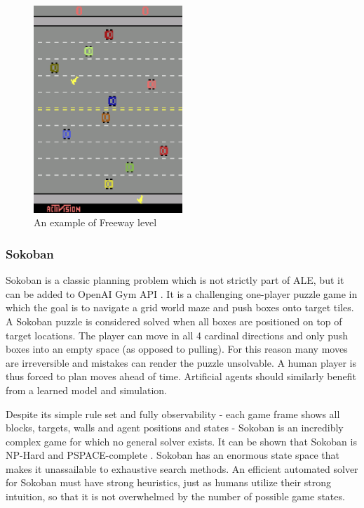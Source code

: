 \begin{figure}[H]
\includegraphics[width=0.5\textwidth,keepaspectratio]{figures/Freeway.png}
\caption[Freeway]{An example of Freeway level}
\label{Fig.Freeway}
\end{figure}

\subsubsection{Sokoban}

Sokoban is a classic planning problem which is not strictly part of ALE, but it can be added to OpenAI Gym API \cite{Code.Sokoban}. It is a challenging one-player puzzle game in which the goal is to navigate a grid world maze and push boxes onto target tiles. A Sokoban puzzle is considered solved when all boxes are positioned on top of target locations. The player can move in all 4 cardinal directions and only push boxes into an empty space (as opposed to pulling). For this reason many moves are irreversible and mistakes can render the puzzle unsolvable. A human player is thus forced to plan moves ahead of time. Artificial agents should similarly benefit from a learned model and simulation.

Despite its simple rule set and fully observability - each game frame shows all blocks, targets, walls and agent positions and states - Sokoban is an incredibly complex game for which no general solver exists. It can be shown that Sokoban is NP-Hard and PSPACE-complete \cite{Benchmark.Sokoban}. Sokoban has an enormous state space that makes it unassailable to exhaustive search methods. An efficient automated solver for Sokoban must have strong heuristics, just as humans utilize their strong intuition, so that it is not overwhelmed by the number of possible game states.

